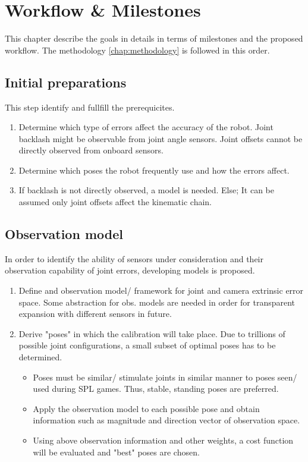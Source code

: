 \documentclass[english, printversion, nomenclature, notitle]{tuvisionthesis} %
\begin{document}
\chapter{Workflow \& Milestones}
\label{chap:workflow}

This chapter describe the goals in details in terms of milestones and the proposed workflow.  The methodology \cref{chap:methodology} is followed in this order.

\section{Initial preparations}
This step identify and fullfill the prerequicites.

\begin{enumerate}
	\item Determine which type of errors affect the accuracy of the robot.
	\subitem Joint backlash might be observable from joint angle sensors.
	\subitem Joint offsets cannot be directly observed from onboard sensors.
	\item Determine which poses the robot frequently use and how the errors affect.
	\item If backlash is not directly observed, a model is needed.
	\subitem Else; It can be assumed only joint offsets affect the kinematic chain.
\end{enumerate}

\section{Observation model}
In order to identify the ability of sensors under consideration and their observation capability of joint errors, developing  models is proposed.

\begin{enumerate}
	\item Define and observation model/ framework for joint and camera extrinsic error space.
	\subitem Some abstraction for obs. models are needed in order for transparent expansion with different sensors in future.
	\item Derive "poses" in which the calibration will take place. Due to trillions of possible joint configurations, a small subset of optimal poses has to be determined.
	\begin{itemize}
		\item Poses must be similar/ stimulate joints in similar manner to poses seen/ used during SPL games. Thus, stable, standing poses are preferred.
		\item Apply the observation model to each possible pose and obtain information such as magnitude and direction vector of observation space.
		\item Using above observation information and other weights, a cost function will be evaluated and "best" poses are chosen.
	\end{itemize}
\end{enumerate}
\end{document}
